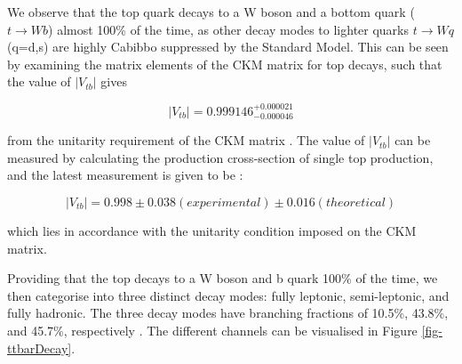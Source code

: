 We observe that the top quark decays to a W boson and a bottom quark ($t \to Wb$) almost 100\% of the time, as other decay modes to lighter quarks $t \to Wq$ (q=d,s) are highly Cabibbo suppressed by the Standard Model. This can be seen by examining the matrix elements of the CKM matrix for top decays, such that the value of $|V_{tb}|$ gives

\begin{equation}
|V_{tb}| = 0.999146^{+0.000021}_{-0.000046}
\end{equation}

from the unitarity requirement of the CKM matrix \cite{PhysRevD.86.010001}. The value of $|V_{tb}|$ can be measured by calculating the production cross-section of single top production, and the latest measurement is given to be \cite{Khachatryan:2014iya}:

\begin{equation}
|V_{tb}| = 0.998 \pm 0.038 (experimental) \pm 0.016 (theoretical)
\end{equation}

which lies in accordance with the unitarity condition imposed on the CKM matrix. 

Providing that the top decays to a W boson and b quark 100\% of the time, we then categorise into three distinct decay modes: fully leptonic, semi-leptonic, and fully hadronic. The three decay modes have branching fractions of 10.5\%, 43.8\%, and 45.7\%, respectively \cite{PhysRevD.86.010001}. The different channels can be visualised in Figure \ref{fig-ttbarDecay}.

